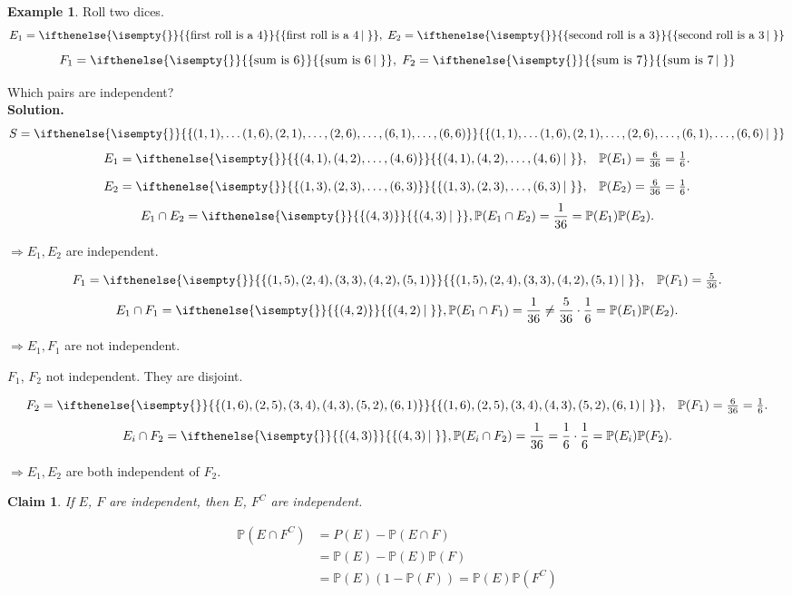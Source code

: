 \documentclass[a4paper,11pt]{amsbook}
\makeatletter
\renewenvironment{proof}[1][\proofname]{\par
    \pushQED{\qed}%
    \normalfont \topsep6\p@\@plus6\p@\relax
    \trivlist
    \itemindent\z@ %
    \item[\hskip\labelsep
          \scshape
      #1\@addpunct{.}]\ignorespaces
}{%
    \popQED\endtrivlist\@endpefalse
}
\newtheorem{claim}{\hspace{-2em} \color{darkblue} Claim}[chapter]
\theoremstyle{definition}
\newtheorem{example}{\hspace{-2em} \color{darkblue} Example}[chapter]
\theoremstyle{remark}
\renewcommand{\P}{\mathbb{P}}
\newcommand\0{\varnothing}
\newcommand\set[2][]
{
    \ifthenelse{\isempty{#1}}
    {
        \left\{#2\right\}
    }
    {
        \left\{#2\left|\,#1\right.\right\}
    }
}
\makeatother
\begin{document}
    \begin{example}
        Roll two dices. 
        $$E_1=\set{\text{first roll is a 4}},\;E_2=\set{\text{second roll is a 3}}$$
        $$F_1=\set{\text{sum is 6}},\;F_2=\set{\text{sum is 7}}$$

        Which pairs are independent?\\
        \textbf{Solution.}
        $$S=\set{(1,1),\ldots(1,6),(2,1),\ldots,(2,6),\ldots,(6,1),\ldots,(6,6)}$$
        $$\begin{matrix}
            E_1=\set{(4,1),(4,2),\ldots,(4,6)}, & \P(E_1)=\frac6{36}=\frac16. \\[10pt]
            E_2=\set{(1,3),(2,3),\ldots,(6,3)}, & \P(E_2)=\frac6{36}=\frac16.
        \end{matrix}$$
        $$E_1\cap E_2=\set{(4,3)},\P(E_1\cap E_2)=\frac1{36}=\P(E_1)\P(E_2).$$

        $\Rightarrow E_1,E_2$ are independent.

        $$\begin{matrix}
            F_1=\set{(1,5),(2,4),(3,3),(4,2),(5,1)}, & \P(F_1)=\frac5{36}.
        \end{matrix}$$
        $$E_1\cap F_1=\set{(4,2)},\P(E_1\cap F_1)=\frac1{36}\neq\frac5{36}\cdot\frac16=\P(E_1)\P(E_2).$$
        
        $\Rightarrow E_1,F_1$ are not independent.

        $F_1$, $F_2$ not independent. They are disjoint.

        $$\begin{matrix}
            F_2=\set{(1,6),(2,5),(3,4),(4,3),(5,2),(6,1)}, & \P(F_1)=\frac6{36}=\frac16.
        \end{matrix}$$
        $$E_i\cap F_2=\set{(4,3)},\P(E_i\cap F_2)=\frac1{36}=\frac16\cdot\frac16=\P(E_i)\P(F_2).$$

        $\Rightarrow E_1,E_2$ are both independent of $F_2$.
    \end{example}

    \begin{claim}
        If $E$, $F$ are independent, then $E$, $F^C$ are independent.
    \end{claim}
    \begin{proof}
        \begin{align*}
            \P(E\cap F^C)&=P(E)-\P(E\cap F) \\
            &=\P(E)-\P(E)\P(F) \tag{independence} \\
            &=\P(E)(1-\P(F))=\P(E)\P(F^C)
        \end{align*}
    \end{proof}
\end{document}

